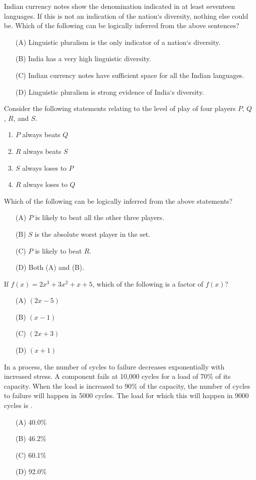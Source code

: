 \item Indian currency notes show the denomination indicated in at least seventeen languages. If this is not an indication of the nation`s diversity, nothing else could be. Which of the following can be logically inferred from the above sentences?
\begin{enumerate}
    \item[(A)] Linguistic pluralism is the only indicator of a nation`s diversity.
    \item[(B)] India has a very high linguistic diversity.
    \item[(C)] Indian currency notes have sufficient space for all the Indian languages.
    \item[(D)] Linguistic pluralism is strong evidence of India`s diversity.
\end{enumerate}
\item Consider the following statements relating to the level of play of four players $P$, $Q$, $R$, and $S$.
\begin{enumerate}
    \item $P$ always beats $Q$
    \item $R$ always beats $S$
    \item $S$ always loses to $P$
    \item $R$ always loses to $Q$
\end{enumerate}
Which of the following can be logically inferred from the above statements?
\begin{enumerate}
    \item[(A)] $P$ is likely to beat all the other three players.
    \item[(B)] $S$ is the absolute worst player in the set.
    \item[(C)] $P$ is likely to beat $R$.
    \item[(D)] Both (A) and (B).
\end{enumerate}
\item If $f(x) = 2x^3 + 3x^2 + x + 5$, which of the following is a factor of $f(x)$?
\begin{enumerate}
    \item[(A)] $(2x - 5)$
    \item[(B)] $(x - 1)$
    \item[(C)] $(2x + 3)$
    \item[(D)] $(x + 1)$
\end{enumerate}
\item In a process, the number of cycles to failure decreases exponentially with increased stress. A component fails at 10,000 cycles for a load of 70\% of its capacity. When the load is increased to 90\% of the capacity, the number of cycles to failure will happen in 5000 cycles. The load for which this will happen in 9000 cycles is .
\begin{enumerate}
    \item[(A)] 40.0\%
    \item[(B)] 46.2\%
    \item[(C)] 60.1\%
    \item[(D)] 92.0\%
\end{enumerate}

